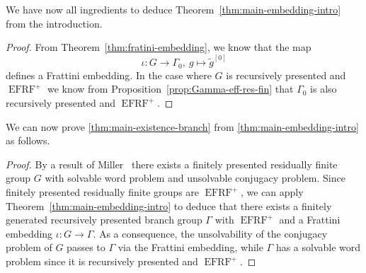 \documentclass[a4paper]{amsart}
\numberwithin{equation}{section}
\theoremstyle{definition}
\theoremstyle{remark}
\DeclareMathOperator{\EFRF}{EFRF}
\begin{document}
We have now all ingredients to deduce Theorem~\ref{thm:main-embedding-intro} from the introduction.

\EmbeddingTheorem*

\begin{proof}
From Theorem~\ref{thm:fratini-embedding}, we know that the map
\[
\iota \colon G \rightarrow \Gamma_0,\ g \mapsto \widetilde{g}^{[0]}
\]
defines a Frattini embedding.
In the case where $G$ is recursively presented and $\EFRF^{+}$ we know from Proposition~\ref{prop:Gamma-eff-res-fin} that $\Gamma_0$ is also recursively presented and $\EFRF^{+}$.
\end{proof}

We can now prove \cref{thm:main-existence-branch} from \cref{thm:main-embedding-intro} as follows.

\MainTheorem*

\begin{proof}
By a result of Miller~\cite[Theorem~9 on p.~31]{Miller1971} there exists a finitely presented residually finite group $G$ with solvable word problem and unsolvable conjugacy problem.
Since finitely presented residually finite groups are $\EFRF^{+}$, we can apply Theorem~\ref{thm:main-embedding-intro} to deduce that there exists a finitely generated recursively presented branch group $\Gamma$ with $\EFRF^{+}$ and a Frattini embedding $\iota \colon G \rightarrow \Gamma$.
As a consequence, the unsolvability of the conjugacy problem of $G$ passes to $\Gamma$ via the Frattini embedding, while $\Gamma$ has a solvable word problem since it is recursively presented and $\EFRF^{+}$.
\end{proof}




\end{document}
